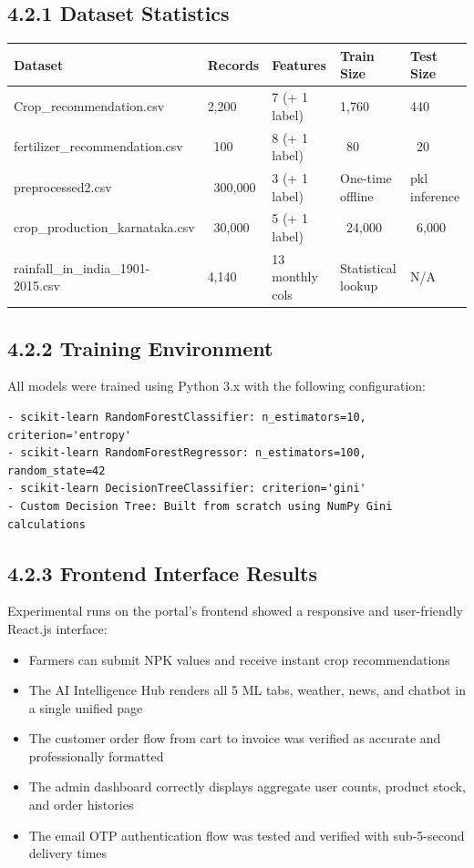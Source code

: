 \documentclass[12pt,a4paper]{report}
\begin{document}
\subsection{4.2.1 Dataset Statistics}

\begin{table}[h!]
\centering
\begin{tabular}{|l|l|l|l|l|}
\hline
Dataset & Records & Features & Train Size & Test Size \\ \hline
Crop\_recommendation.csv & 2,200 & 7 (+ 1 label) & 1,760 & 440 \\ \hline
fertilizer\_recommendation.csv & ~100 & 8 (+ 1 label) & ~80 & ~20 \\ \hline
preprocessed2.csv & ~300,000 & 3 (+ 1 label) & One-time offline & pkl inference \\ \hline
crop\_production\_karnataka.csv & ~30,000 & 5 (+ 1 label) & ~24,000 & ~6,000 \\ \hline
rainfall\_in\_india\_1901-2015.csv & 4,140 & 13 monthly cols & Statistical lookup & N/A \\ \hline
\end{tabular}
\end{table}

\subsection{4.2.2 Training Environment}

All models were trained using Python 3.x with the following configuration:

\begin{verbatim}
- scikit-learn RandomForestClassifier: n_estimators=10, criterion='entropy'
- scikit-learn RandomForestRegressor: n_estimators=100, random_state=42
- scikit-learn DecisionTreeClassifier: criterion='gini'
- Custom Decision Tree: Built from scratch using NumPy Gini calculations
\end{verbatim}

\subsection{4.2.3 Frontend Interface Results}

Experimental runs on the portal's frontend showed a responsive and user-friendly React.js interface:

\begin{itemize}
\item Farmers can submit NPK values and receive instant crop recommendations
\item The AI Intelligence Hub renders all 5 ML tabs, weather, news, and chatbot in a single unified page
\item The customer order flow from cart to invoice was verified as accurate and professionally formatted
\item The admin dashboard correctly displays aggregate user counts, product stock, and order histories
\item The email OTP authentication flow was tested and verified with sub-5-second delivery times
\end{itemize}
\end{document}

